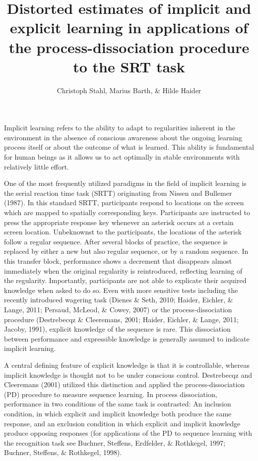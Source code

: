 \documentclass[
  english,
  man]{apa6}
\title{Distorted estimates of implicit and explicit learning in applications of the process-dissociation procedure to the SRT task}
\author{Christoph Stahl\textsuperscript{}, Marius Barth\textsuperscript{}, \& Hilde Haider\textsuperscript{}}
\date{}
\affiliation{\vspace{0.5cm}\textsuperscript{} University of Cologne}
\begin{document}
\maketitle

Implicit learning refers to the ability to adapt to regularities inherent in the environment in the absence of conscious awareness about the ongoing learning process itself or about the outcome of what is learned.
This ability is fundamental for human beings as it allows us to act optimally in stable environments with relatively little effort.

One of the most frequently utilized paradigms in the field of implicit learning is the serial reaction time task (SRTT) originating from Nissen and Bullemer (1987).
In this standard SRTT, participants respond to locations on the screen which are mapped to spatially corresponding keys.
Participants are instructed to press the appropriate response key whenever an asterisk occurs at a certain screen location.
Unbeknownst to the participants, the locations of the asterisk follow a regular sequence.
After several blocks of practice, the sequence is replaced by either a new but also regular sequence, or by a random sequence.
In this transfer block, performance shows a decrement that disappears almost immediately when the original regularity is reintroduced, reflecting learning of the regularity.
Importantly, participants are not able to explicate their acquired knowledge when asked to do so.
Even with more sensitive tests including the recently introduced wagering task (Dienes \& Seth, 2010; Haider, Eichler, \& Lange, 2011; Persaud, McLeod, \& Cowey, 2007) or the process-dissociation procedure (Destrebecqz \& Cleeremans, 2001; Haider, Eichler, \& Lange, 2011; Jacoby, 1991), explicit knowledge of the sequence is rare.
This dissociation between performance and expressible knowledge is generally assumed to indicate implicit learning.

A central defining feature of explicit knowledge is that it is controllable, whereas implicit knowledge is thought not to be under conscious control.
Destrebecqz and Cleeremans (2001) utilized this distinction and applied the process-dissociation (PD) procedure to measure sequence learning.
In process dissociation, performance in two conditions of the same task is contrasted:
An inclusion condition, in which explicit and implicit knowledge both produce the same response, and an exclusion condition in which explicit and implicit knowledge produce opposing responses (for applications of the PD to sequence learning with the recognition task see Buchner, Steffens, Erdfelder, \& Rothkegel, 1997; Buchner, Steffens, \& Rothkegel, 1998).
\end{document}
